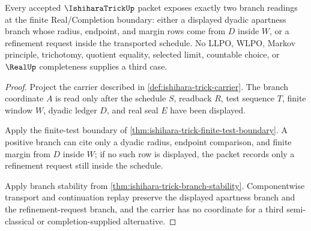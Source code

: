 \begin{theorem}
\label{thm:ishihara-trick-binary-branch-boundary}
Every accepted $\IshiharaTrickUp$ packet exposes exactly two branch readings at the finite Real/Completion boundary: either a displayed dyadic apartness branch whose radius, endpoint, and margin rows come from $D$ inside $W$, or a refinement request inside the transported schedule. No LLPO, WLPO, Markov principle, trichotomy, quotient equality, selected limit, countable choice, or $\RealUp$ completeness supplies a third case.
\end{theorem}
\begin{proof}
Project the carrier described in \autoref{def:ishihara-trick-carrier}. The branch coordinate $A$ is read only after the schedule $S$, readback $R$, test sequence $T$, finite window $W$, dyadic ledger $D$, and real seal $E$ have been displayed.

Apply the finite-test boundary of \autoref{thm:ishihara-trick-finite-test-boundary}. A positive branch can cite only a dyadic radius, endpoint comparison, and finite margin from $D$ inside $W$; if no such row is displayed, the packet records only a refinement request still inside the schedule.

Apply branch stability from \autoref{thm:ishihara-trick-branch-stability}. Componentwise transport and continuation replay preserve the displayed apartness branch and the refinement-request branch, and the carrier has no coordinate for a third semi-classical or completion-supplied alternative.
\end{proof}

